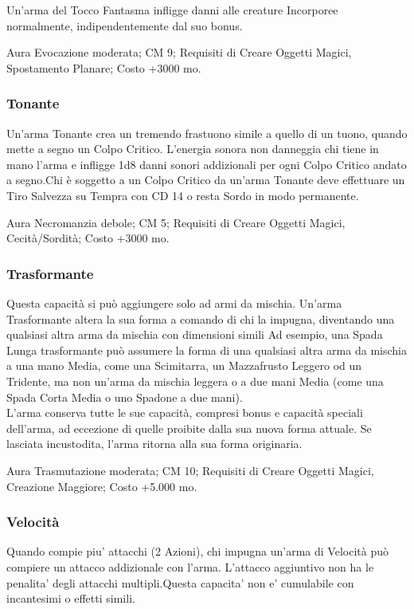 \begin{multicols}{2}
Un'arma del Tocco Fantasma infligge danni alle creature Incorporee normalmente, indipendentemente dal suo bonus. 

Aura Evocazione moderata; CM 9; Requisiti di Creare Oggetti Magici, Spostamento Planare; Costo +3000 mo.

\subsubsection{Tonante}

Un'arma Tonante crea un tremendo frastuono simile a quello di un tuono, quando mette a segno un Colpo Critico. L'energia sonora non danneggia chi tiene in mano l'arma e infligge 1d8 danni sonori addizionali per ogni Colpo Critico andato a segno.Chi è soggetto a un Colpo Critico da un'arma Tonante deve effettuare un Tiro Salvezza su Tempra con CD 14 o resta Sordo in modo permanente.

Aura Necromanzia debole; CM 5; Requisiti di Creare Oggetti Magici, Cecità/Sordità; Costo +3000 mo.

\subsubsection{Trasformante}

Questa capacità si può aggiungere solo ad armi da mischia. Un'arma Trasformante altera la sua forma a comando di chi la impugna, diventando una qualsiasi altra arma da mischia con dimensioni simili Ad esempio, una Spada Lunga trasformante può assumere la forma di una qualsiasi altra arma da mischia a una mano Media, come una Scimitarra, un Mazzafrusto Leggero od un Tridente, ma non un'arma da mischia leggera o a due mani Media (come una Spada Corta Media o uno Spadone a due mani).\\
L'arma conserva tutte le sue capacità, compresi bonus e capacità speciali dell'arma, ad eccezione di quelle proibite dalla sua nuova forma attuale. Se lasciata incustodita, l'arma ritorna alla sua forma originaria.

Aura Trasmutazione moderata; CM 10; Requisiti di Creare Oggetti Magici, Creazione Maggiore; Costo +5.000 mo.

\subsubsection{Velocità}

Quando compie piu' attacchi (2 Azioni), chi impugna un'arma di Velocità può compiere un attacco addizionale con l'arma. L'attacco aggiuntivo non ha le penalita' degli attacchi multipli.Questa capacita' non e' cumulabile con incantesimi o effetti simili.


\end{multicols}
